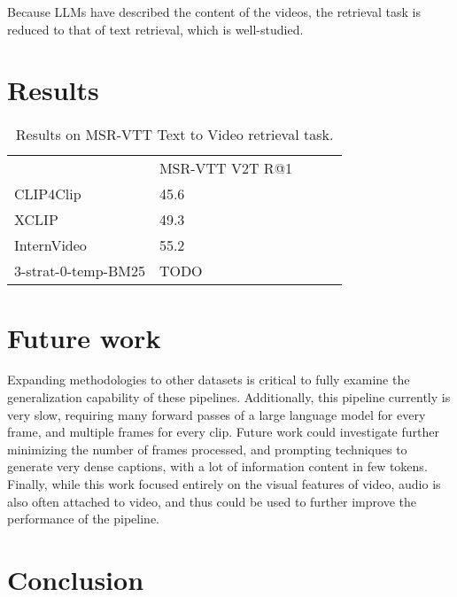 \documentclass{article}
\begin{document}
Because LLMs have described the content of the videos, the retrieval task is reduced to that of text retrieval, which is well-studied.

\section{Results}

\begin{table}[]
\begin{tabular}{|l|l|lll}
\cline{1-2}
                    & MSR-VTT V2T R@1 &  &  &  \\ \cline{1-2}
CLIP4Clip           & 45.6            &  &  &  \\ \cline{1-2}
XCLIP               & 49.3            &  &  &  \\ \cline{1-2}
InternVideo         & 55.2            &  &  &  \\ \cline{1-2}
3-strat-0-temp-BM25 & TODO            &  &  &  \\ \cline{1-2}
\end{tabular}
\caption{Results on MSR-VTT Text to Video retrieval task.}
\end{table}

\section{Future work}

Expanding methodologies to other datasets is critical to fully examine the generalization capability of these pipelines.
Additionally, this pipeline currently is very slow, requiring many forward passes of a large language model for every frame, and multiple frames for every clip.
Future work could investigate further minimizing the number of frames processed, and prompting techniques to generate very dense captions, with a lot of information content in few tokens.
Finally, while this work focused entirely on the visual features of video, audio is also often attached to video, and thus could be used to further improve the performance of the pipeline.

\section{Conclusion}



\end{document}
